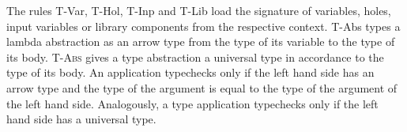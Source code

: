 \begin{prooftree}
\end{prooftree}

\begin{prooftree}
\end{prooftree}

\begin{prooftree}
\end{prooftree}

\begin{prooftree}
\end{prooftree}

\begin{prooftree}
\end{prooftree}

\begin{prooftree}
\end{prooftree}

\begin{prooftree}
\end{prooftree}

\begin{prooftree}
\end{prooftree}

The rules T-Var, T-Hol, T-Inp and T-Lib load the signature of variables, holes, input variables or library components from the respective context.
T-Abs types a lambda abstraction as an arrow type from the type of its variable to the type of its body. \textsc{T-Abs} gives a type abstraction a universal type in accordance to the type of its body.
An application typechecks only if the left hand side has an arrow type and the type of the argument is equal to the type of the argument of the left hand side. Analogously, a type application typechecks only if the left hand side has a universal type.

